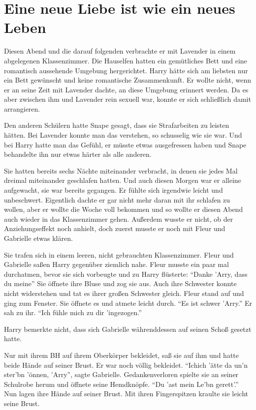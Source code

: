 \chapter{Eine neue Liebe ist wie ein neues Leben}


Diesen Abend und die darauf folgenden verbrachte er mit Lavender in einem abgelegenen Klassenzimmer. Die Hauselfen hatten ein gemütliches Bett und eine romantisch aussehende Umgebung hergerichtet. Harry hätte sich am liebsten nur ein Bett gewünscht und keine romantische Zusammenkunft. Er wollte nicht, wenn er an seine Zeit mit Lavender dachte, an diese Umgebung erinnert werden. Da es aber zwischen ihm und Lavender rein sexuell war, konnte er sich schließlich damit arrangieren.

Den anderen Schülern hatte Snape gesagt, dass sie Strafarbeiten zu leisten hätten. Bei Lavender konnte man das verstehen, so schusselig wie sie war. Und bei Harry hatte man das Gefühl, er müsste etwas ausgefressen haben und Snape behandelte ihn nur etwas härter als alle anderen.

Sie hatten bereits sechs Nächte miteinander verbracht, in denen sie jedes Mal dreimal miteinander geschlafen hatten. Und auch diesen Morgen war er alleine aufgewacht, sie war bereits gegangen. Er fühlte sich irgendwie leicht und unbeschwert. Eigentlich dachte er gar nicht mehr daran mit ihr schlafen zu wollen, aber er wollte die Woche voll bekommen und so wollte er diesen Abend auch wieder in das Klassenzimmer gehen. Außerdem wusste er nicht, ob der Anziehungseffekt noch anhielt, doch zuerst musste er noch mit Fleur und Gabrielle etwas klären.

Sie trafen sich in einem leeren, nicht gebrauchten Klassenzimmer. Fleur und Gabrielle saßen Harry gegenüber \gst ziemlich nahe. Fleur musste ein paar mal durchatmen, bevor sie sich vorbeugte und zu Harry flüsterte: \enquote{Danke 'Arry, dass du meine\abs} Sie öffnete ihre Bluse und zog sie aus. Auch ihre Schwester konnte nicht widerstehen und tat es ihrer großen Schwester gleich. Fleur stand auf und ging zum Fenster. Sie öffnete es und atmete leicht durch. \enquote{Es ist schwer 'Arry.} Er sah zu ihr. \enquote{Ich fühle mich zu dir 'ingezogen.}

Harry bemerkte nicht, dass sich Gabrielle währenddessen auf seinen Schoß gesetzt hatte.

Nur mit ihrem BH auf ihrem Oberkörper bekleidet, saß sie auf ihm und hatte beide Hände auf seiner Brust. Er war noch völlig bekleidet. \enquote{Ich\abs ich 'ätte da un'n ster'bn 'önnen, 'Arry}, sagte Gabrielle. Gedankenverloren spielte sie an seiner Schulrobe herum und öffnete seine Hemdknöpfe. \enquote{Du 'ast mein Le'bn gerett'.} Nun lagen ihre Hände auf seiner Brust. Mit ihren Fingerspitzen kraulte sie leicht seine Brust.

